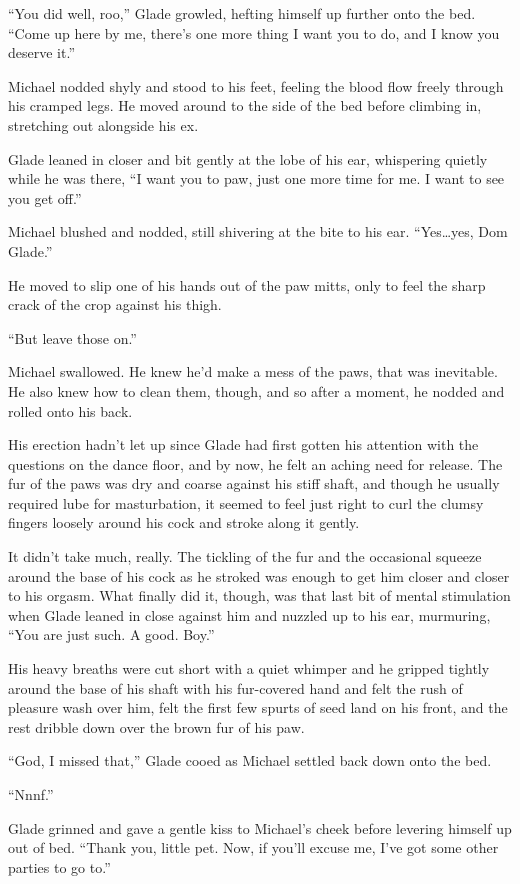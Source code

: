 ``You did well, roo,'' Glade growled, hefting himself up further onto the bed. ``Come up here by me, there's one more thing I want you to do, and I know you deserve it.''

Michael nodded shyly and stood to his feet, feeling the blood flow freely through his cramped legs. He moved around to the side of the bed before climbing in, stretching out alongside his ex.

Glade leaned in closer and bit gently at the lobe of his ear, whispering quietly while he was there, ``I want you to paw, just one more time for me. I want to see you get off.''

Michael blushed and nodded, still shivering at the bite to his ear. ``Yes\ldots{}yes, Dom Glade.''

He moved to slip one of his hands out of the paw mitts, only to feel the sharp crack of the crop against his thigh.

``But leave those on.''

Michael swallowed. He knew he'd make a mess of the paws, that was inevitable. He also knew how to clean them, though, and so after a moment, he nodded and rolled onto his back.

His erection hadn't let up since Glade had first gotten his attention with the questions on the dance floor, and by now, he felt an aching need for release. The fur of the paws was dry and coarse against his stiff shaft, and though he usually required lube for masturbation, it seemed to feel just right to curl the clumsy fingers loosely around his cock and stroke along it gently.

It didn't take much, really. The tickling of the fur and the occasional squeeze around the base of his cock as he stroked was enough to get him closer and closer to his orgasm. What finally did it, though, was that last bit of mental stimulation when Glade leaned in close against him and nuzzled up to his ear, murmuring, ``You are just such. A good. Boy.''

His heavy breaths were cut short with a quiet whimper and he gripped tightly around the base of his shaft with his fur-covered hand and felt the rush of pleasure wash over him, felt the first few spurts of seed land on his front, and the rest dribble down over the brown fur of his paw.

``God, I missed that,'' Glade cooed as Michael settled back down onto the bed.

``Nnnf.''

Glade grinned and gave a gentle kiss to Michael's cheek before levering himself up out of bed. ``Thank you, little pet. Now, if you'll excuse me, I've got some other parties to go to.''

